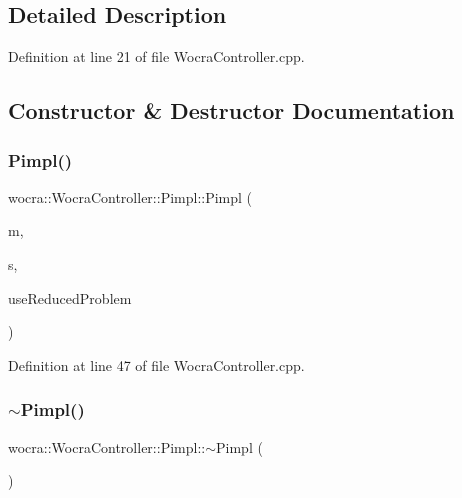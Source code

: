 \subsection{Detailed Description}


Definition at line 21 of file Wocra\+Controller.\+cpp.



\subsection{Constructor \& Destructor Documentation}
\hypertarget{structwocra_1_1WocraController_1_1Pimpl_ae9e38baadd765c1005354808ea768800}{}\label{structwocra_1_1WocraController_1_1Pimpl_ae9e38baadd765c1005354808ea768800} 
\subsubsection{\texorpdfstring{Pimpl()}{Pimpl()}}
{\footnotesize\ttfamily wocra\+::\+Wocra\+Controller\+::\+Pimpl\+::\+Pimpl (\begin{DoxyParamCaption}\item[{std\+::shared\+\_\+ptr$<$ \hyperlink{classocra_1_1Model}{Model} $>$}]{m,  }\item[{std\+::shared\+\_\+ptr$<$ \hyperlink{classocra_1_1OneLevelSolver}{One\+Level\+Solver} $>$}]{s,  }\item[{bool}]{use\+Reduced\+Problem }\end{DoxyParamCaption})\hspace{0.3cm}{\ttfamily [inline]}}



Definition at line 47 of file Wocra\+Controller.\+cpp.

\hypertarget{structwocra_1_1WocraController_1_1Pimpl_a9e7ca6582122e345e4d51d30ed481450}{}\label{structwocra_1_1WocraController_1_1Pimpl_a9e7ca6582122e345e4d51d30ed481450} 
\subsubsection{\texorpdfstring{$\sim$\+Pimpl()}{~Pimpl()}}
{\footnotesize\ttfamily wocra\+::\+Wocra\+Controller\+::\+Pimpl\+::$\sim$\+Pimpl (\begin{DoxyParamCaption}{ }\end{DoxyParamCaption})\hspace{0.3cm}{\ttfamily [inline]}}



